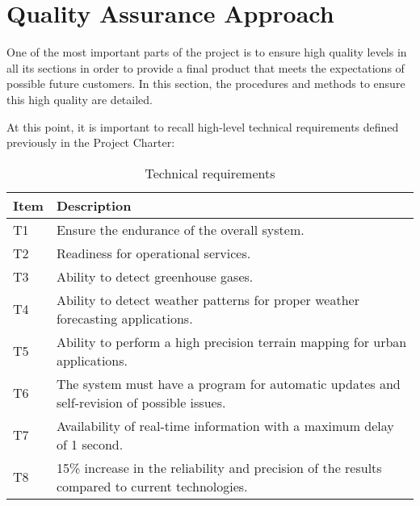 \section{Quality Assurance Approach}
One of the most important parts of the project is to ensure high quality levels in all its sections in order to provide a final product that meets the expectations of possible future customers. In this section, the procedures and methods to ensure this high quality are detailed. 

At this point, it is important to recall high-level technical requirements defined previously in the Project Charter:
\begin{table}[H]
	\centering
	\begin{tabular}{l p{13.3cm}}
		
		\toprule[2pt]
		
		\textbf{Item} &  \textbf{Description}\\
		
		\midrule [1.5pt]
		
		T1 & Ensure the endurance of the overall system.\vspace{0.2cm}\\
		
		\midrule
		
		T2 & Readiness for operational services.\vspace{0.2cm}\\
		
		\midrule
		
		T3 & Ability to detect greenhouse gases.\vspace{0.2cm}\\
		
		\midrule
		
		T4 & Ability to detect weather patterns for proper weather forecasting applications.\vspace{0.2cm}\\
		
		\midrule
		
		T5 & Ability to perform a high precision terrain mapping for urban applications.\vspace{0.2cm}\\
		
		\midrule
		
		T6 & The system must have a program for automatic updates and self-revision of possible issues.\vspace{0.2cm}\\
		
		\midrule
		
		T7 & Availability of real-time information with a maximum delay of 1 second.\vspace{0.2cm}\\
		
		\midrule
		
		T8 & 15\% increase in the reliability and precision of the results compared to current technologies.\vspace{0.2cm}\\
		
		\bottomrule[2pt]
		
	\end{tabular}
	\caption{Technical requirements}
\end{table}

